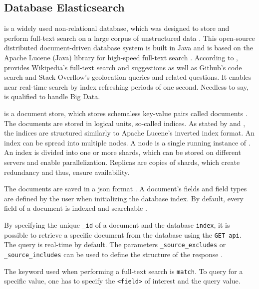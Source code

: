 
\subsection{Database Elasticsearch}\label{sec:db}

\databaseName{} is a widely used non-relational database, which was designed to store and perform full-text search on a large corpus of unstructured data \cite{Elasticsearch2017}.
This open-source distributed document-driven database system is built in Java and is based on the Apache Lucene (Java) library for high-speed full-text search \cite{Elasticsearch2017, Elasticsearch2019}.
According to \citeauthor{Elasticsearch2019}, \databaseName{} provides Wikipedia's full-text search and suggestions as well as Github's code search and Stack Overflow's geolocation queries and related questions.
It enables near real-time search by index refreshing periods of one second.
Needless to say, \databaseName{} is qualified to handle Big Data.

\databaseName{} is a document store, which stores schemaless key-value pairs called documents \cite{flask2018}.
The documents are stored in logical units, so-called indices.
As stated by \citeauthor{Elasticsearch2019} and \citeauthor{Elasticsearch2017}, the indices are structured similarly to Apache Lucene's inverted index format.
An index can be spread into multiple nodes.
A node is a single running instance of \databaseName{} \cite{Elasticsearch2019}.
An index is divided into one or more shards, which can be stored on different servers and enable parallelization.
Replicas are copies of shards, which create redundancy and thus, ensure availability. %

The documents are saved in a \ac{json} format \cite{Elasticsearch2017}.
A document's fields and field types are defined by the user when initializing the database index.
By default, every field of a document is indexed and searchable \cite{Elasticsearch2019}.

By specifying the unique \texttt{\_id} of a document and the database \texttt{index}, it is possible to retrieve a specific document from the database using the \texttt{GET \ac{api}}.
The query is real-time by default.
The parameters \texttt{\_source\_excludes} or \texttt{\_source\_includes} can be used to define the structure of the response \cite{Elasticsearch-get}.

The keyword used when performing a full-text search is \texttt{match}.
To query for a specific value, one has to specify the \texttt{<field>} of interest and the query value.


